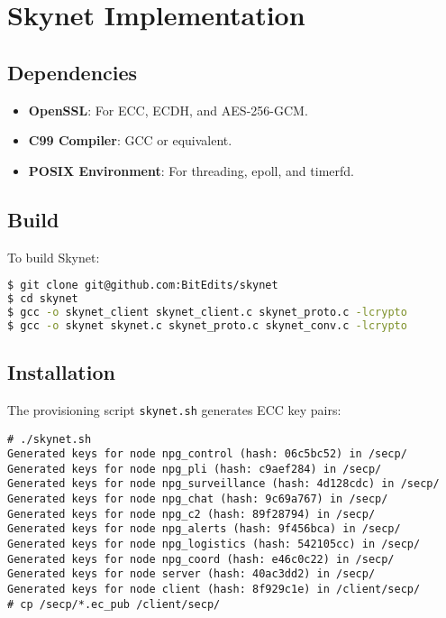 \documentclass{article}
\begin{document}
\section{Skynet Implementation}

\subsection{Dependencies}
\begin{itemize}
    \item \textbf{OpenSSL}: For ECC, ECDH, and AES-256-GCM.
    \item \textbf{C99 Compiler}: GCC or equivalent.
    \item \textbf{POSIX Environment}: For threading, epoll, and timerfd.
\end{itemize}

\subsection{Build}
To build Skynet:
\begin{lstlisting}[language=bash]
$ git clone git@github.com:BitEdits/skynet
$ cd skynet
$ gcc -o skynet_client skynet_client.c skynet_proto.c -lcrypto
$ gcc -o skynet skynet.c skynet_proto.c skynet_conv.c -lcrypto
\end{lstlisting}

\newpage
\subsection{Installation}
The provisioning script \texttt{skynet.sh} generates ECC key pairs:
\begin{lstlisting}
# ./skynet.sh
Generated keys for node npg_control (hash: 06c5bc52) in /secp/
Generated keys for node npg_pli (hash: c9aef284) in /secp/
Generated keys for node npg_surveillance (hash: 4d128cdc) in /secp/
Generated keys for node npg_chat (hash: 9c69a767) in /secp/
Generated keys for node npg_c2 (hash: 89f28794) in /secp/
Generated keys for node npg_alerts (hash: 9f456bca) in /secp/
Generated keys for node npg_logistics (hash: 542105cc) in /secp/
Generated keys for node npg_coord (hash: e46c0c22) in /secp/
Generated keys for node server (hash: 40ac3dd2) in /secp/
Generated keys for node client (hash: 8f929c1e) in /client/secp/
# cp /secp/*.ec_pub /client/secp/
\end{lstlisting}
\end{document}
